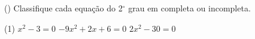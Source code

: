 \begin{question}[type=exam] () %
Classifique cada equação do 2$^\circ$ grau em completa ou incompleta.
    \begin{tasks}(1)
       \task $x^2-3=0$
        \task $-9x^2+2x+6=0$
        \task $2x^2-30=0$
    \end{tasks}
\end{question}
